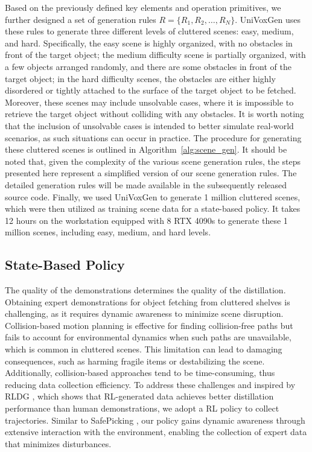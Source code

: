 Based on the previously defined key elements and operation primitives, we further designed a set of generation rules $R = \{R_1, R_2, \dots, R_N\}$. UniVoxGen uses these rules to generate three different levels of cluttered scenes: easy, medium, and hard. Specifically, the easy scene is highly organized, with no obstacles in front of the target object; the medium difficulty scene is partially organized, with a few objects arranged randomly, and there are some obstacles in front of the target object; in the hard difficulty scenes, the obstacles are either highly disordered or tightly attached to the surface of the target object to be fetched. Moreover, these scenes may include unsolvable cases, where it is impossible to retrieve the target object without colliding with any obstacles. It is worth noting that the inclusion of unsolvable cases is intended to better simulate real-world scenarios, as such situations can occur in practice. The procedure for generating these cluttered scenes is outlined in Algorithm~\ref{alg:scene_gen}. It should be noted that, given the complexity of the various scene generation rules, the steps presented here represent a simplified version of our scene generation rules. The detailed generation rules will be made available in the subsequently released source code. Finally, we used UniVoxGen to generate 1 million cluttered scenes, which were then utilized as training scene data for a state-based policy. It takes 12 hours on the workstation equipped with 8 RTX 4090s to generate these 1 million scenes, including easy, medium, and hard levels.
\subsection{State-Based Policy}
\label{state-based_policy}
The quality of the demonstrations determines the quality of the distillation.
Obtaining expert demonstrations for object fetching from cluttered shelves is challenging, as it requires dynamic awareness to minimize scene disruption. Collision-based motion planning is effective for finding collision-free paths but fails to account for environmental dynamics when such paths are unavailable, which is common in cluttered scenes. This limitation can lead to damaging consequences, such as harming fragile items or destabilizing the scene. Additionally, collision-based approaches tend to be time-consuming, thus reducing data collection efficiency. 
To address these challenges and inspired by RLDG \cite{xu2024rldg}, which shows that RL-generated data achieves better distillation performance than human demonstrations, we adopt a RL policy to collect trajectories. Similar to SafePicking \cite{wada2022safepicking}, our policy gains dynamic awareness through extensive interaction with the environment, enabling the collection of expert data that minimizes disturbances.

